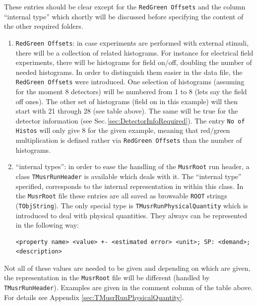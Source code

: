\documentclass[twoside]{article}
\newcommand{\musrroot}{\texttt{MusrRoot}\xspace}
\newcommand{\rootcern}{\texttt{ROOT}\xspace}
\newcommand{\redgreen}{\color{red}red\color{black}/\color{green}green\color{black}\xspace}
\newcommand{\tmrh}{\texttt{TMusrRunHeader}\xspace}
\newcommand{\tquant}{\texttt{TMusrRunPhysicalQuantity}\xspace}
\begin{document}
\noindent These entries should be clear except for the \texttt{RedGreen Offsets} and the column ``internal type'' which shortly will be discussed before specifying the content of the other required folders. 
\renewcommand{\theenumi}{\Roman{enumi}}
\begin{enumerate}
 \item \texttt{RedGreen Offsets}: in case experiments are performed with external stimuli, there will be a collection of related histograms. For instance for electrical field experiments, there will be histograms for field on/off, doubling the number of needed histograms. In order to distinguish them easier in the data file, the \texttt{RedGreen Offsets} were introduced. One selection of histograms (assuming for the moment 8 detectors) will be numbered from 1 to 8 (lets say the field off ones). The other set of histograms (field on in this example) will then start with 21 through 28 (see table above). The same will be true for the detector information (see Sec.\,\ref{sec:DetectorInfoRequired}). The entry \texttt{No of Histos} will only give 8 for the given example, meaning that \redgreen multiplication is defined rather via \texttt{RedGreen Offsets} than the number of histograms. 
 \item ``internal types'': in order to ease the handling of the \musrroot run header, a class \tmrh is available which deals with it. The ``internal type'' specified, corresponds to the internal representation in within this class. In the \musrroot file these entries are all saved as browsable \rootcern strings (\texttt{TObjString}). The only special type is \tquant which is introduced to deal with physical quantities. They always can be represented in the following way:
  \begin{small}
  \begin{leftbar}
  \begin{verbatim}
<property name> <value> +- <estimated error> <unit>; SP: <demand>; <description>
  \end{verbatim}
  \end{leftbar}
  \end{small}
\end{enumerate}
\renewcommand{\theenumi}{\arabic{enumi}}

\noindent Not all of these values are needed to be given and depending on which are given, the representation in the \musrroot file will be different (handled by \tmrh). Examples are given in the comment column of the table above. For details see Appendix \ref{sec:TMusrRunPhysicalQuantity}.
\end{document}
